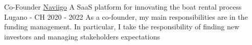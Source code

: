 
\begin{cventries}
  \cventry
    {Co-Founder} %
    {\href{https://www.naviigo.com}{Naviigo}} %
    {A SaaS platform for innovating the boat rental process}
    {Lugano - CH} %
    {2020 -  2022} %
    {
      As a co-founder, my main responsibilities are in the funding management. In particular, I take the responsibility of finding new investors and managing stakeholders expectations
    }
\end{cventries}